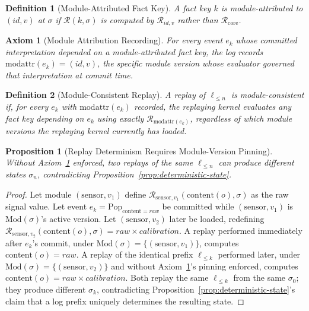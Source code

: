 \documentclass[11pt]{article}
\newtheorem{definition}{Definition}[section]
\newtheorem{axiom}{Axiom}[section]
\newtheorem{proposition}{Proposition}[section]
\begin{document}
\begin{definition}[Module-Attributed Fact Key]
\label{def:module-attributed}
A fact key $k$ is module-attributed to $(id,v)$ at $\sigma$ if $\mathcal{R}(k,\sigma)$ is computed by $\mathcal{R}_{id,v}$ rather than $\mathcal{R}_{\mathrm{core}}$.
\end{definition}

\begin{axiom}[Module Attribution Recording]
\label{ax:module-attribution}
For every event $e_k$ whose committed interpretation depended on a module-attributed fact key, the log records $\mathrm{modattr}(e_k) = (id,v)$, the specific module version whose evaluator governed that interpretation at commit time.
\end{axiom}

\begin{definition}[Module-Consistent Replay]
\label{def:module-consistent-replay}
A replay of $\ell_{\le n}$ is module-consistent if, for every $e_k$ with $\mathrm{modattr}(e_k)$ recorded, the replaying kernel evaluates any fact key depending on $e_k$ using exactly $\mathcal{R}_{\mathrm{modattr}(e_k)}$, regardless of which module versions the replaying kernel currently has loaded.
\end{definition}

\begin{proposition}[Replay Determinism Requires Module-Version Pinning]
\label{prop:replay-needs-pinning}
Without Axiom~\ref{ax:module-attribution} enforced, two replays of the same $\ell_{\le n}$ can produce different states $\sigma_n$, contradicting Proposition~\ref{prop:deterministic-state}.
\end{proposition}
\begin{proof}
Let module $(\mathrm{sensor}, v_1)$ define $\mathcal{R}_{\mathrm{sensor},v_1}(\mathrm{content}(o),\sigma)$ as the raw signal value. Let event $e_k = \mathrm{Pop}_{\mathrm{content}=\mathit{raw}}$ be committed while $(\mathrm{sensor},v_1)$ is $\mathrm{Mod}(\sigma)$'s active version. Let $(\mathrm{sensor},v_2)$ later be loaded, redefining $\mathcal{R}_{\mathrm{sensor},v_2}(\mathrm{content}(o),\sigma) = \mathit{raw} \times \mathit{calibration}$. A replay performed immediately after $e_k$'s commit, under $\mathrm{Mod}(\sigma)=\{(\mathrm{sensor},v_1)\}$, computes $\mathrm{content}(o) = \mathit{raw}$. A replay of the identical prefix $\ell_{\le k}$ performed later, under $\mathrm{Mod}(\sigma)=\{(\mathrm{sensor},v_2)\}$ and without Axiom~\ref{ax:module-attribution}'s pinning enforced, computes $\mathrm{content}(o) = \mathit{raw} \times \mathit{calibration}$. Both replay the same $\ell_{\le k}$ from the same $\sigma_0$; they produce different $\sigma_k$, contradicting Proposition~\ref{prop:deterministic-state}'s claim that a log prefix uniquely determines the resulting state.
\end{proof}
\end{document}
